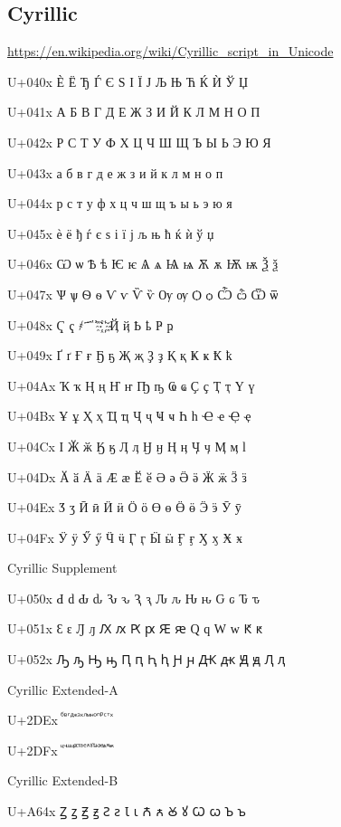  
\subsection{Cyrillic}
\url{https://en.wikipedia.org/wiki/Cyrillic_script_in_Unicode}

U+040x 	Ѐ 	Ё 	Ђ 	Ѓ 	Є 	Ѕ 	І 	Ї 	Ј 	Љ 	Њ 	Ћ 	Ќ 	Ѝ 	Ў 	Џ

U+041x 	А 	Б 	В 	Г 	Д 	Е 	Ж 	З 	И 	Й 	К 	Л 	М 	Н 	О 	П

U+042x 	Р 	С 	Т 	У 	Ф 	Х 	Ц 	Ч 	Ш 	Щ 	Ъ 	Ы 	Ь 	Э 	Ю 	Я

U+043x 	а 	б 	в 	г 	д 	е 	ж 	з 	и 	й 	к 	л 	м 	н 	о 	п

U+044x 	р 	с 	т 	у 	ф 	х 	ц 	ч 	ш 	щ 	ъ 	ы 	ь 	э 	ю 	я

U+045x 	ѐ 	ё 	ђ 	ѓ 	є 	ѕ 	і 	ї 	ј 	љ 	њ 	ћ 	ќ 	ѝ 	ў 	џ

U+046x 	Ѡ 	ѡ 	Ѣ 	ѣ 	Ѥ 	ѥ 	Ѧ 	ѧ 	Ѩ 	ѩ 	Ѫ 	ѫ 	Ѭ 	ѭ 	Ѯ 	ѯ

U+047x 	Ѱ 	ѱ 	Ѳ 	ѳ 	Ѵ 	ѵ 	Ѷ 	ѷ 	Ѹ 	ѹ 	Ѻ 	ѻ 	Ѽ 	ѽ 	Ѿ 	ѿ

U+048x 	Ҁ 	ҁ 	҂ 	 ҃ 	 ҄ 	 ҅ 	 ҆ 	 ҇ 	 ҈ 	 ҉ 	Ҋ 	ҋ 	Ҍ 	ҍ 	Ҏ 	ҏ

U+049x 	Ґ 	ґ 	Ғ 	ғ 	Ҕ 	ҕ 	Җ 	җ 	Ҙ 	ҙ 	Қ 	қ 	Ҝ 	ҝ 	Ҟ 	ҟ

U+04Ax 	Ҡ 	ҡ 	Ң 	ң 	Ҥ 	ҥ 	Ҧ 	ҧ 	Ҩ 	ҩ 	Ҫ 	ҫ 	Ҭ 	ҭ 	Ү 	ү

U+04Bx 	Ұ 	ұ 	Ҳ 	ҳ 	Ҵ 	ҵ 	Ҷ 	ҷ 	Ҹ 	ҹ 	Һ 	һ 	Ҽ 	ҽ 	Ҿ 	ҿ

U+04Cx 	Ӏ 	Ӂ 	ӂ 	Ӄ 	ӄ 	Ӆ 	ӆ 	Ӈ 	ӈ 	Ӊ 	ӊ 	Ӌ 	ӌ 	Ӎ 	ӎ 	ӏ

U+04Dx 	Ӑ 	ӑ 	Ӓ 	ӓ 	Ӕ 	ӕ 	Ӗ 	ӗ 	Ә 	ә 	Ӛ 	ӛ 	Ӝ 	ӝ 	Ӟ 	ӟ

U+04Ex 	Ӡ 	ӡ 	Ӣ 	ӣ 	Ӥ 	ӥ 	Ӧ 	ӧ 	Ө 	ө 	Ӫ 	ӫ 	Ӭ 	ӭ 	Ӯ 	ӯ

U+04Fx 	Ӱ 	ӱ 	Ӳ 	ӳ 	Ӵ 	ӵ 	Ӷ 	ӷ 	Ӹ 	ӹ 	Ӻ 	ӻ 	Ӽ 	ӽ 	Ӿ 	ӿ

Cyrillic Supplement

U+050x 	Ԁ 	ԁ 	Ԃ 	ԃ 	Ԅ 	ԅ 	Ԇ 	ԇ 	Ԉ 	ԉ 	Ԋ 	ԋ 	Ԍ 	ԍ 	Ԏ 	ԏ

U+051x 	Ԑ 	ԑ 	Ԓ 	ԓ 	Ԕ 	ԕ 	Ԗ 	ԗ 	Ԙ 	ԙ 	Ԛ 	ԛ 	Ԝ 	ԝ 	Ԟ 	ԟ

U+052x 	Ԡ 	ԡ 	Ԣ 	ԣ 	Ԥ 	ԥ 	Ԧ 	ԧ 	Ԩ 	ԩ 	Ԫ 	ԫ 	Ԭ 	ԭ 	Ԯ 	ԯ

Cyrillic Extended-A

U+2DEx 	 ⷠ 	 ⷡ 	 ⷢ 	 ⷣ 	 ⷤ 	 ⷥ 	 ⷦ 	 ⷧ 	 ⷨ 	 ⷩ 	 ⷪ 	 ⷫ 	 ⷬ 	 ⷭ 	 ⷮ 	 ⷯ

U+2DFx 	 ⷰ 	 ⷱ 	 ⷲ 	 ⷳ 	 ⷴ 	 ⷵ 	 ⷶ 	 ⷷ 	 ⷸ 	 ⷹ 	 ⷺ 	 ⷻ 	 ⷼ 	 ⷽ 	 ⷾ 	 ⷿ

Cyrillic Extended-B

U+A64x 	Ꙁ 	ꙁ 	Ꙃ 	ꙃ 	Ꙅ 	ꙅ 	Ꙇ 	ꙇ 	Ꙉ 	ꙉ 	Ꙋ 	ꙋ 	Ꙍ 	ꙍ 	Ꙏ 	ꙏ

